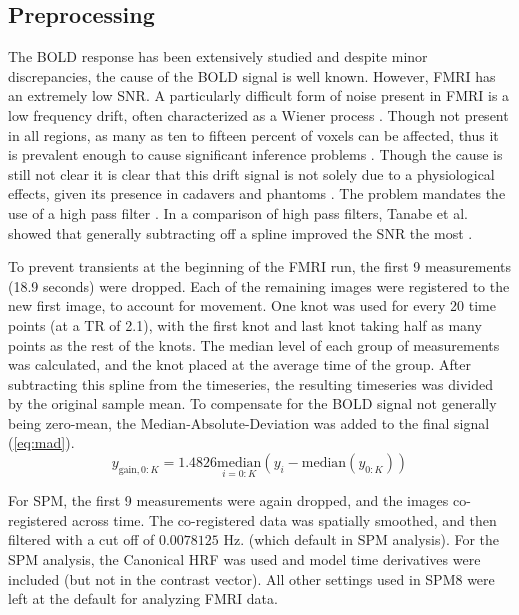 \documentclass[journal]{./IEEEtran}
\begin{document}
\subsection{Preprocessing}
The BOLD response has been
extensively studied and despite minor discrepancies, the cause of the BOLD
signal is well known. However, FMRI has an extremely low SNR. 
A particularly difficult form of noise present 
in FMRI is a low frequency
drift, often characterized as a Wiener process \cite{Riera2004}.
Though not present in all regions, as many as ten to fifteen percent
of voxels can be affected, thus it is prevalent 
enough to cause significant inference problems \cite{Tanabe2002, Smith2007}. 
Though the cause is still not
clear it is clear that this drift signal is not solely
due to a physiological effects, given its presence in cadavers and phantoms
\cite{Smith1999}. The problem mandates the use of a high pass 
filter \cite{Smith2007}.  In a comparison of high pass filters,
Tanabe et al.  showed that generally subtracting off
a spline improved the SNR the most \cite{Tanabe2002}.

To prevent transients at the beginning of the FMRI run, the first 9
measurements (18.9 seconds) were dropped. Each of the remaining 
images were registered to the new first image, to account for
movement. 
One knot was used for every 20 time points (at a TR of 2.1), with the first
knot and last knot taking half as many points as the rest of the knots.
The median level of each group of measurements was calculated, and the
knot placed at the average time of the group. After subtracting this spline
from the timeseries, the resulting timeseries was divided by the original
sample mean. To compensate for the BOLD signal not generally being zero-mean,
the Median-Absolute-Deviation was added to the final signal (\autoref{eq:mad}). 
\begin{equation}
y_{\text{gain}, 0:K} = 1.4826\underset{i=0:K}{\text{median}}(y_i - 
        \text{median}(y_{0:K}))
\label{eq:mad}
\end{equation}

For SPM, the first 9 measurements were again dropped, and the images
co-registered across time. The co-registered data was spatially smoothed,
and then filtered with a cut off of $0.0078125$ Hz. (which default in
SPM analysis). For the SPM analysis, the Canonical HRF was used
and model time derivatives were included (but not in the contrast
vector). All other settings used in SPM8 were left at the default
for analyzing FMRI data.
\end{document}
